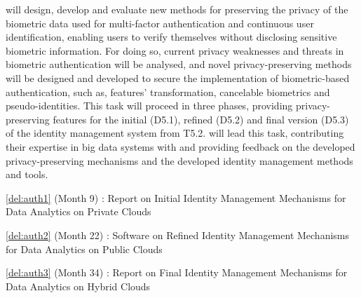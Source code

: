 \begin{Workpackage}{\thewpno}
\begin{Task}
\TaskResults{%
\ref{del:auth1},
\ref{del:auth2},
\ref{del:auth3}
}
\TaskHeader{}
\theTask{} will design, develop and evaluate new methods for preserving the privacy of the biometric data used for multi-factor authentication and continuous user identification, enabling users to verify themselves without disclosing sensitive biometric information. For doing so, current privacy weaknesses and threats in biometric authentication will be analysed, and novel privacy-preserving methods will be designed and developed to secure the implementation of biometric-based authentication, such as, features' transformation, cancelable biometrics and pseudo-identities. This task will proceed in three phases, providing privacy-preserving features for the initial (D5.1), refined (D5.2) and final version (D5.3) of the identity management system from T5.2. \UODshort{} will lead this task, contributing their expertise in big data systems with \FRQshort{} and \COGNIshort{} providing feedback on the developed privacy-preserving mechanisms and the developed identity management methods and tools.
\end{Task}


\begin{WPDeliverables}
  \begin{compactitem}
  \item \ref{del:auth1} (Month 9) : Report on Initial Identity Management Mechanisms for Data Analytics on Private Clouds
	\item \ref{del:auth2} (Month 22) : Software on Refined Identity Management Mechanisms for Data Analytics on Public Clouds
\item \ref{del:auth3} (Month 34) : Report on Final Identity Management Mechanisms for Data Analytics on Hybrid Clouds
\end{compactitem}
\end{WPDeliverables}
\end{Workpackage}
